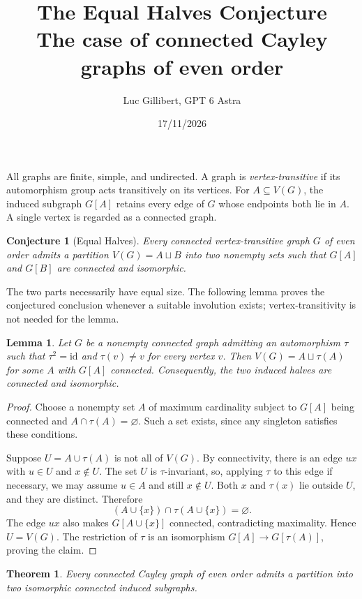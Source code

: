\documentclass[11pt,a4paper]{article}
\title{The Equal Halves Conjecture\\[0.3em]
  \large The case of connected Cayley graphs of even order}
\author{Luc Gillibert, GPT 6 Astra}
\date{17/11/2026}
\newtheorem{conjecture}{Conjecture}
\newtheorem{lemma}{Lemma}
\newtheorem{theorem}{Theorem}
\begin{document}
\maketitle
\vspace{-2em}

All graphs are finite, simple, and undirected. A graph is
\emph{vertex-transitive} if its automorphism group acts transitively on
its vertices. For $A\subseteq V(G)$, the induced subgraph $G[A]$ retains
every edge of $G$ whose endpoints both lie in $A$. A single vertex is
regarded as a connected graph.

\begin{conjecture}[Equal Halves]
Every connected vertex-transitive graph $G$ of even order admits a
partition $V(G)=A\sqcup B$ into two nonempty sets such that $G[A]$ and
$G[B]$ are connected and isomorphic.
\end{conjecture}

The two parts necessarily have equal size. The following lemma proves
the conjectured conclusion whenever a suitable involution exists;
vertex-transitivity is not needed for the lemma.

\begin{lemma}
Let $G$ be a nonempty connected graph admitting an automorphism $\tau$
such that $\tau^2=\mathrm{id}$ and $\tau(v)\ne v$ for every vertex $v$.
Then $V(G)=A\sqcup\tau(A)$ for some $A$ with $G[A]$ connected.
Consequently, the two induced halves are connected and isomorphic.
\end{lemma}

\begin{proof}
Choose a nonempty set $A$ of maximum cardinality subject to $G[A]$
being connected and $A\cap\tau(A)=\varnothing$. Such a set exists,
since any singleton satisfies these conditions.

Suppose $U=A\cup\tau(A)$ is not all of $V(G)$. By connectivity, there
is an edge $ux$ with $u\in U$ and $x\notin U$. The set $U$ is
$\tau$-invariant, so, applying $\tau$ to this edge if necessary, we may
assume $u\in A$ and still $x\notin U$. Both $x$ and $\tau(x)$ lie
outside $U$, and they are distinct. Therefore
\[
  (A\cup\{x\})\cap\tau(A\cup\{x\})=\varnothing.
\]
The edge $ux$ also makes $G[A\cup\{x\}]$ connected, contradicting
maximality. Hence $U=V(G)$. The restriction of $\tau$ is an
isomorphism $G[A]\to G[\tau(A)]$, proving the claim.
\end{proof}

\begin{theorem}
Every connected Cayley graph of even order admits a partition into
two isomorphic connected induced subgraphs.
\end{theorem}
\end{document}
